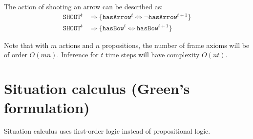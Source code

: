 \begin{description}
        \begin{example}
            The action of shooting an arrow can be described as:
            \[
                \begin{split}
                    \texttt{SHOOT}^t &\Rightarrow \{ \texttt{hasArrow}^t \iff \lnot\texttt{hasArrow}^{t+1} \} \\
                    \texttt{SHOOT}^t &\Rightarrow \{ \texttt{hasBow}^t \iff \texttt{hasBow}^{t+1} \}
                \end{split}  
            \]
        \end{example}

        Note that with $m$ actions and $n$ propositions, the number of frame axioms will be of order $O(mn)$.
        Inference for $t$ time steps will have complexity $O(nt)$.
\end{description}



\section{Situation calculus (Green's formulation)}
Situation calculus uses first-order logic instead of propositional logic.

